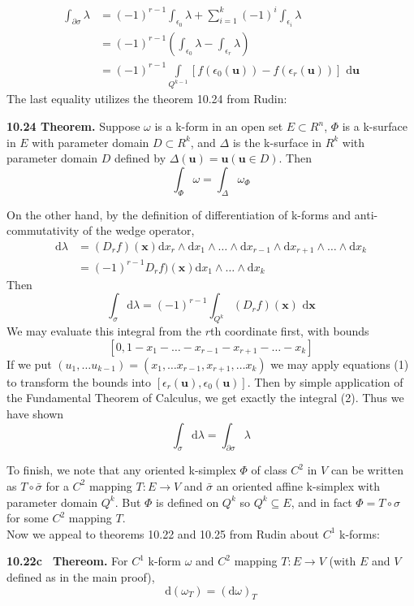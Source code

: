 \documentclass{article}
\newenvironment{myindentpar}[1]
  {\begin{list}{}
          {\setlength{\leftmargin}{#1}}
          \item[]
  }
  {\end{list}}
\begin{document}
\begin{equation}
\begin{split}
    \int_{\partial\sigma} \lambda &= (-1)^{r-1}\int_{\epsilon_0} \lambda + \sum^k_{i=1}(-1)^i\int_{\epsilon_i} \lambda\\
    &= (-1)^{r-1}(\int_{\epsilon_0}\lambda - \int_{\epsilon_r} \lambda )\\
    &= (-1)^{r-1} \int\limits_{Q^{k-1}} \left[f(\epsilon_0(\textbf{u})) - f(\epsilon_r(\textbf{u})) \right] \textrm{ d}\textbf{u}
\end{split}
\end{equation}
The last equality utilizes the theorem 10.24 from Rudin:
\begin{myindentpar}{0em}
\textbf{10.24 \; Theorem.} Suppose $\omega$ is a k-form in an open set $E \subset R^n$, $\Phi$ is a k-surface in $E$ with parameter domain $D \subset R^k$, and $\Delta$ is the k-surface in $R^k$ with parameter domain $D$ defined by $\Delta(\textbf{u}) = \textbf{u}(\textbf{u} \in D)$. Then 
$$\int_\Phi \omega = \int_\Delta \omega_\Phi$$
\end{myindentpar}
On the other hand, by the definition of differentiation of k-forms and anti-commutativity of the wedge operator,
\begin{equation*}
\begin{split}
    \textrm{d}\lambda &= (D_r f)(\textbf{x}) \textrm{d}x_r \wedge \textrm{d}x_1 \wedge \dots \wedge \textrm{d}x_{r-1} \wedge \textrm{d}x_{r+1} \wedge \dots \wedge \textrm{d}x_k\\
    &= (-1)^{r-1} D_r f)(\textbf{x}) \textrm{d}x_1 \wedge \dots \wedge \textrm{d}x_{k}
\end{split}
\end{equation*}
Then
$$\int_\sigma \textrm{d}\lambda = (-1)^{r-1} \int_{Q^{k}} (D_r f)(\textbf{x}) \textrm{ d}\textbf{x}$$
We may evaluate this integral from the $r$th coordinate first, with bounds
$$[0,1-x_1-\dots -x_{r-1} - x_{r+1} - \dots - x_k]$$
If we put $(u_1,\dots u_{k-1}) = (x_1, \dots x_{r-1},x_{r+1},\dots x_k)$ we may apply equations (1) to transform the bounds into $[\epsilon_r(\textbf{u}), \epsilon_0(\textbf{u})]$. Then by simple application of the Fundamental Theorem of Calculus, we get exactly the integral (2). Thus we have shown
\begin{equation}
\int_\sigma \textrm{d}\lambda =\int_{\partial\sigma}\lambda
\end{equation}

To finish, we note that any oriented k-simplex $\Phi$ of class $C^2$ in $V$ can be written as $T\circ \bar{\sigma}$ for a $C^2$ mapping $T: E\to V$ and $\bar{\sigma}$ an oriented affine k-simplex with parameter domain $Q^k$. But $\Phi$ is defined on $Q^k$ so $Q^k \subseteq E$, and in fact $\Phi = T\circ \sigma$ for some $C^2$ mapping $T$.\\
Now we appeal to theorems 10.22 and 10.25 from Rudin about $C^1$ k-forms:
\begin{myindentpar}{0em}
\textbf{10.22c \, Thereom. } For $C^1$ k-form $\omega$ and $C^2$ mapping $T: E\to V$ (with $E$ and $V$ defined as in the main proof),
$$\textrm{d}(\omega_T) = (\textrm{d}\omega)_T$$
\end{myindentpar}
\end{document}
